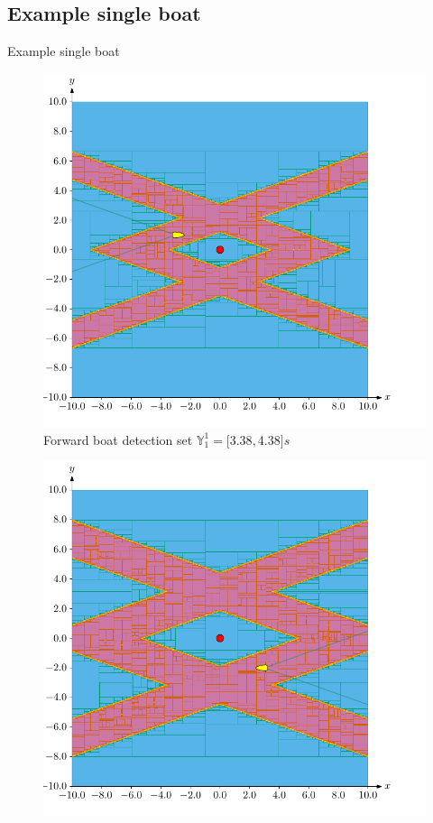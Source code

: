 \documentclass{beamer}
\begin{document}
        \subsection{Example single boat}

            \begin{frame}{Example single boat}
                \begin{minipage}{0.45\textwidth}
                    \begin{figure}
                            \includegraphics[width=\textwidth]{imgs/forward}
                            \caption{Forward boat detection set $\mathbb{Y}_1^1 = \lbrack3.38, 4.38\rbrack s$}
                    \end{figure}
                \end{minipage}
                \hfill
                \begin{minipage}{0.45\textwidth}
                    \begin{figure}
                            \includegraphics[width=\textwidth]{imgs/backward}

\end{figure}
\end{minipage}
\end{frame}
\end{document}
